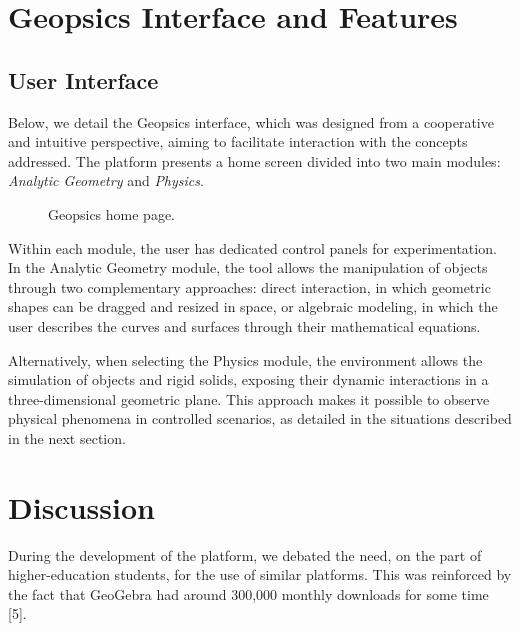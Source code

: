 \documentclass[conference,a4paper]{IEEEtran}
\begin{document}
\section{Geopsics Interface and Features}

\subsection{User Interface}

Below, we detail the Geopsics interface, which was designed from a cooperative and intuitive perspective, aiming to facilitate interaction with the concepts addressed. The platform presents a home screen divided into two main modules: \textit{Analytic Geometry} and \textit{Physics}.

\begin{figure}[h]
\centering
{}
\caption{Geopsics home page.}
\label{fig:home}
\end{figure}

Within each module, the user has dedicated control panels for experimentation. In the Analytic Geometry module, the tool allows the manipulation of objects through two complementary approaches: direct interaction, in which geometric shapes can be dragged and resized in space, or algebraic modeling, in which the user describes the curves and surfaces through their mathematical equations.

Alternatively, when selecting the Physics module, the environment allows the simulation of objects and rigid solids, exposing their dynamic interactions in a three-dimensional geometric plane. This approach makes it possible to observe physical phenomena in controlled scenarios, as detailed in the situations described in the next section.

\section{Discussion}

During the development of the platform, we debated the need, on the part of higher-education students, for the use of similar platforms. This was reinforced by the fact that GeoGebra had around 300{,}000 monthly downloads for some time [5].
\end{document}
